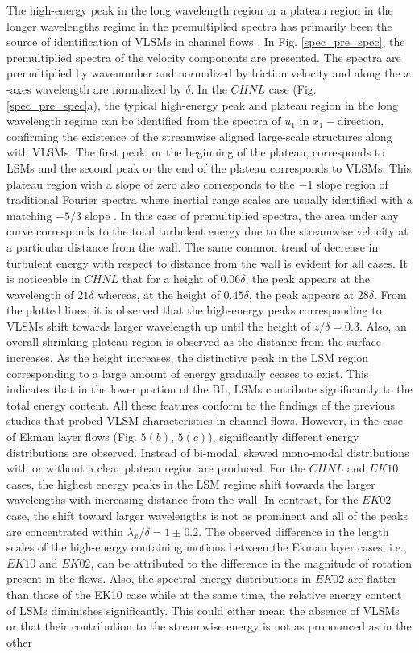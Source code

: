 The high-energy peak in the  long wavelength region or a plateau region in the longer wavelengths regime in the premultiplied spectra has primarily been the source of identification of VLSMs in channel flows \cite{guala_adrian_jfm2006, fang2015blm}. In Fig. \ref{spec_pre_spec}, the premultiplied spectra of the velocity components are presented. The spectra are premultiplied by wavenumber and normalized by friction velocity and along the $x$-axes wavelength are normalized by $\delta$.  In the $CHNL$ case (Fig. \ref{spec_pre_spec}a), the typical high-energy peak and plateau region in the long wavelength regime can be identified from the spectra of $u_1$ in $x_1-$direction, confirming the existence of the streamwise aligned large-scale structures along with VLSMs. The first peak, or the beginning of the plateau, corresponds to LSMs and the second peak or the end of the plateau corresponds to VLSMs. This plateau region with a slope of zero also corresponds to the $-1$ slope region of traditional Fourier spectra where inertial range scales are usually identified with a matching $-5/3$ slope \cite{perry_chng_jfm_86,saddoughi1994}. In this case of premultiplied spectra, the area under any curve corresponds to the total turbulent energy due to the streamwise velocity at a particular distance from the wall. The same common trend of decrease in turbulent energy with respect to distance from the wall is evident for all cases. It is noticeable in $CHNL$  that for a height of $0.06\delta$, the peak appears at the wavelength of $21\delta$ whereas, at the height of $0.45\delta$, the peak appears at $28\delta$. From the plotted lines, it is observed that the high-energy peaks corresponding to VLSMs shift towards larger wavelength up until the height of $z/\delta = 0.3$. Also, an overall shrinking plateau region is observed as the distance from the surface increases. As the height increases, the distinctive peak in the LSM region corresponding to a large amount of energy gradually ceases to exist. This indicates that in the lower portion of the BL, LSMs contribute significantly to the total energy content. All these features conform to the findings of the previous studies that probed  VLSM characteristics in channel flows. However, in the case of Ekman layer flows (Fig. $5(b)$, $5(c)$), significantly  different energy distributions are observed. Instead of bi-modal, skewed mono-modal distributions with or without a clear plateau region are produced. For the $CHNL$ and $EK10$ cases, the highest energy peaks in the LSM regime shift towards the larger wavelengths with increasing distance from the wall. In contrast, for the $EK02$ case, the shift toward  larger wavelengths is not as prominent and all of the peaks are concentrated within $\lambda_x/\delta=1 \pm 0.2$. The observed difference in the length scales of the high-energy containing motions between the Ekman layer cases, i.e., $EK10$ and $EK02$, can be attributed to the difference in the magnitude of rotation present in the flows. Also, the spectral energy distributions in $EK02$  are flatter than those of the EK10 case while at the same time, the relative energy content of LSMs diminishes significantly. This could either mean the absence of VLSMs or that their contribution to the streamwise energy is not as pronounced as in the other 